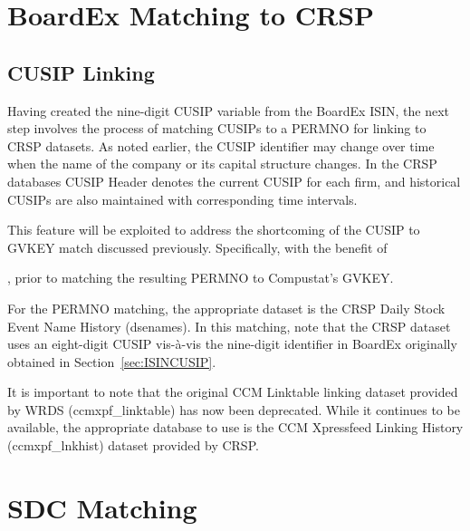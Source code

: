 \documentclass[12pt]{article}
\begin{document}
\section{BoardEx Matching to CRSP}\label{sec:BoardexCRSP}

\subsection{CUSIP Linking}\label{sec:CRSPCUSIPmatch}

Having created the nine-digit CUSIP variable from the BoardEx ISIN, the next step involves the process of matching CUSIPs to a PERMNO for linking to CRSP datasets.
As noted earlier, the CUSIP identifier may change over time when the name of the company or its capital structure changes.
In the CRSP databases CUSIP Header denotes the current CUSIP for each firm, and historical CUSIPs are also maintained with corresponding time intervals.

This feature will be exploited to address the shortcoming of the CUSIP to GVKEY match discussed previously.
Specifically, with the benefit of

, prior to matching the resulting PERMNO to Compustat's GVKEY.



For the PERMNO matching, the appropriate dataset is the CRSP Daily Stock Event Name History (dsenames).
In this matching, note that the CRSP dataset uses an eight-digit CUSIP vis-\`{a}-vis the nine-digit identifier in BoardEx originally obtained in Section~\ref{sec:ISINCUSIP}.





It is important to note that the original CCM Linktable linking dataset provided by WRDS (ccmxpf\_linktable) has now been deprecated.
While it continues to be available, the appropriate database to use is the CCM Xpressfeed Linking History (ccmxpf\_lnkhist) dataset provided by CRSP.


\section{SDC Matching}\label{sec:SDC}
\end{document}
